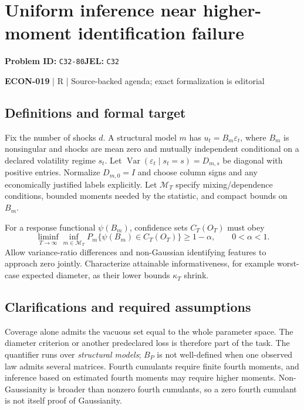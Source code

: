 \documentclass[11pt,a4paper]{article}
\begin{document}
\section*{Uniform inference near higher-moment identification failure}
\textbf{Problem ID:} \texttt{C32-80}\quad \textbf{JEL:} \texttt{C32}\par
\label{problem:OP-0603}


\label{audited:ECON-019}

{\sffamily\small\color{muted}\textbf{ECON-019} | R | Source-backed agenda; exact formalization is editorial\par}

\subsection*{Definitions and formal target}

Fix the number of shocks $d$. A structural model $m$ has $u_t=B_m\varepsilon_t$, where $B_m$ is nonsingular and shocks are mean zero and mutually independent conditional on a declared volatility regime $s_t$. Let $\operatorname{Var}(\varepsilon_t\mid s_t=s)=D_{m,s}$ be diagonal with positive entries. Normalize $D_{m,0}=I$ and choose column signs and any economically justified labels explicitly. Let $\mathcal M_T$ specify mixing/dependence conditions, bounded moments needed by the statistic, and compact bounds on $B_m$.

For a response functional $\psi(B_m)$, confidence sets $C_T(O_T)$ must obey
\[
\liminf_{T\to\infty}\inf_{m\in\mathcal M_T}
 P_m\{\psi(B_m)\in C_T(O_T)\}\geq1-\alpha,
\qquad 0<\alpha<1.
\]
Allow variance-ratio differences and non-Gaussian identifying features to approach zero jointly. Characterize attainable informativeness, for example worst-case expected diameter, as their lower bounds $\kappa_T$ shrink.

\subsection*{Clarifications and required assumptions}

Coverage alone admits the vacuous set equal to the whole parameter space. The diameter criterion or another predeclared loss is therefore part of the task. The quantifier runs over \emph{structural models}; $B_P$ is not well-defined when one observed law admits several matrices. Fourth cumulants require finite fourth moments, and inference based on estimated fourth moments may require higher moments. Non-Gaussianity is broader than nonzero fourth cumulants, so a zero fourth cumulant is not itself proof of Gaussianity.
\end{document}
